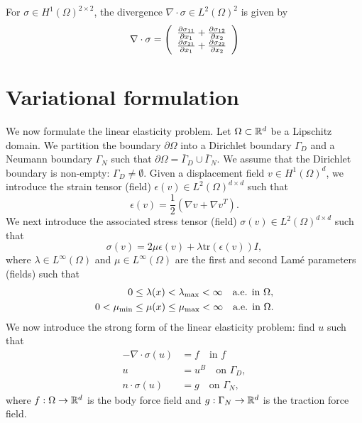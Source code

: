 \begin{corollary}
  For $\sigma \in H^1(\Omega)^{2 \times 2}$, the divergence $\nabla \cdot \sigma \in L^2(\Omega)^2$ is given by
  \begin{equation*}
    \nabla \cdot \sigma =
    \bmat{c}
    \pp{\sigma_{11}}{x_1} + \pp{\sigma_{12}}{x_2} \\
    \pp{\sigma_{21}}{x_1} + \pp{\sigma_{22}}{x_2}
    \emat
  \end{equation*}
\end{corollary}
\section{Variational formulation}
We now formulate the linear elasticity problem. Let $\Omega \subset \RR^d$ be a Lipschitz domain. We partition the boundary $\partial \Omega$ into a Dirichlet boundary $\Gamma_D$ and a Neumann boundary $\Gamma_N$ such that $\partial \Omega = \bar{\Gamma}_D \cup \bar{\Gamma}_N$. We assume that the Dirichlet boundary is non-empty: $\Gamma_D \neq \emptyset$. Given a displacement field $v \in H^1(\Omega)^d$, we introduce the strain tensor (field) $\epsilon(v) \in L^2(\Omega)^{d \times d}$ such that
\begin{equation*}
  \epsilon(v) = \frac{1}{2} (\nabla v + \nabla v^T).
\end{equation*}
We next introduce the associated stress tensor (field) $\sigma(v) \in L^2(\Omega)^{d \times d}$ such that
\begin{equation*}
  \sigma(v) = 2 \mu \epsilon(v) + \lambda \text{tr}(\epsilon(v)) I,
\end{equation*}
where $\lambda \in L^\infty(\Omega)$ and $\mu \in L^\infty(\Omega)$ are the first and second Lam\'e parameters (fields) such that
\begin{align*}
  0 &\leq \lambda(x) < \lambda_{\rm max} < \infty \quad \text{a.e. in } \Omega,\\
  0 < \mu_{\rm min} &\leq \mu(x) \leq \mu_{\rm max} < \infty \quad \text{a.e. in } \Omega.
\end{align*}
 We now introduce the strong form of the linear elasticity problem: find $u$ such that
\begin{align*}
  - \nabla \cdot \sigma(u) &= f \quad \text{in } f \\
  u &= u^B \quad \text{on } \Gamma_{D}, \\
  n \cdot \sigma(u) &= g \quad \text{on } \Gamma_{N},
\end{align*}
where $f: \Omega \to \RR^d$ is the body force field and $g: \Gamma_N \to \RR^d$ is the traction force field. 

